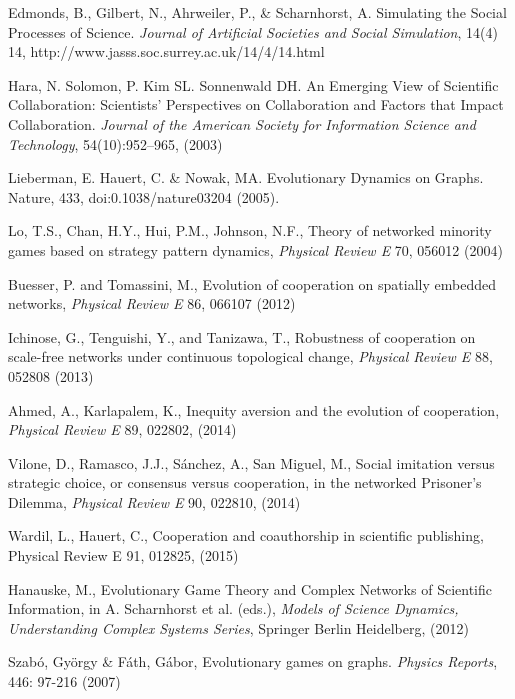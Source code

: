 \documentclass[11pt]{article}
\begin{document}
{\begin{thebibliography}{100}
 Edmonds, B., Gilbert, N., Ahrweiler, P., \&
  Scharnhorst, A. Simulating the Social Processes of Science.
  \textit{Journal of Artificial Societies and Social Simulation},
  14(4) 14,  http://www.jasss.soc.surrey.ac.uk/14/4/14.html
  
 Hara, N. Solomon, P. Kim SL. Sonnenwald DH. An Emerging View of Scientific Collaboration:
  Scientists’ Perspectives on Collaboration and Factors that Impact Collaboration. \textit{Journal of the American
    Society for Information Science and Technology}, 54(10):952–965, (2003) 

 Lieberman, E. Hauert, C. \& Nowak,
  MA. Evolutionary Dynamics on Graphs. Nature, 433, doi:0.1038/nature03204 (2005).

  
 Lo, T.S., Chan, H.Y., Hui, P.M., Johnson, N.F.,
  Theory of networked minority games based on strategy pattern
  dynamics, \textit{Physical Review E} 70, 056012 (2004) 

 Buesser, P. and Tomassini, M., Evolution of
  cooperation on spatially embedded networks, \textit{Physical Review E} 86,
  066107 (2012)  

 Ichinose, G., Tenguishi, Y., and Tanizawa, T.,
  Robustness of cooperation on scale-free networks under continuous
  topological change, \textit{Physical Review E} 88, 052808 (2013) 

 Ahmed, A., Karlapalem, K., Inequity aversion and
  the evolution of cooperation, \textit{Physical Review E} 89, 022802, (2014)

 Vilone, D., Ramasco, J.J., S\'anchez, A., San
  Miguel, M., Social imitation versus strategic choice, or consensus
  versus cooperation, in the networked Prisoner’s Dilemma,
  \textit{Physical Review E} 90, 022810, (2014) 
 
 Wardil, L., Hauert, C., Cooperation and coauthorship in
  scientific publishing, Physical Review E 91, 012825, (2015)
 
  Hanauske, M., Evolutionary Game Theory and Complex Networks of Scientific Information, in A. Scharnhorst et al. (eds.), \textit{Models of Science Dynamics, Understanding Complex Systems Series}, Springer Berlin Heidelberg, (2012)
  
 Szab\'o, Gy\"{o}rgy \& F\'ath, G\'abor,
  Evolutionary games on graphs. \textit{Physics Reports}, 446: 97-216
  (2007) 


\end{thebibliography}}
\end{document}
